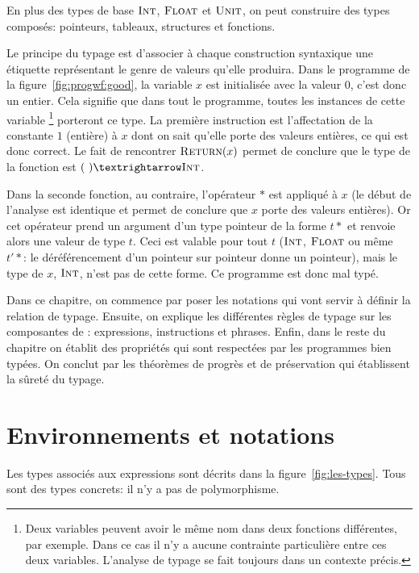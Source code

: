 En plus des types de base $\textsc{Int}$, $\textsc{Float}$ et $\textsc{Unit}$, on peut construire des
types composés: pointeurs, tableaux, structures et fonctions.

Le principe du typage est d'associer à chaque construction syntaxique une
étiquette représentant le genre de valeurs qu'elle produira. Dans le programme
de la figure~\ref{fig:progwf:good}, la variable $x$ est initialisée avec la
valeur $0$, c'est donc un entier. Cela signifie que dans tout le programme,
toutes les instances de cette variable
\footnote{Deux variables peuvent avoir le même nom dans deux fonctions
  différentes, par exemple. Dans ce cas il n'y a aucune contrainte particulière
  entre ces deux variables. L'analyse de typage se fait toujours dans un
  contexte précis.
}
porteront ce type. La première instruction est l'affectation de la constante $1$
(entière) à $x$ dont on sait qu'elle porte des valeurs entières, ce qui est donc
correct. Le fait de rencontrer $\textsc{Return}(x)$ permet de conclure que le type de
la fonction est $(~) → \tInt$.

Dans la seconde fonction, au contraire, l'opérateur $*$ est appliqué à $x$ (le
début de l'analyse est identique et permet de conclure que $x$ porte des valeurs
entières). Or cet opérateur prend un argument d'un type pointeur de la forme
$t*$ et renvoie alors une valeur de type $t$. Ceci est valable pour tout $t$
($\textsc{Int}$, $\textsc{Float}$ ou même $t'*$: le déréférencement d'un pointeur sur pointeur
donne un pointeur), mais le type de $x$, $\textsc{Int}$, n'est pas de cette forme. Ce
programme est donc mal typé.

Dans ce chapitre, on commence par poser les notations qui vont servir à définir
la relation de typage. Ensuite, on explique les différentes règles de typage sur
les composantes de \langname: expressions, instructions et phrases. Enfin, dans
le reste du chapitre on établit des propriétés qui sont respectées par les
programmes bien typées. On conclut par les théorèmes de progrès et de
préservation qui établissent la sûreté du typage.

\section{Environnements et notations}

Les types associés aux expressions sont décrits dans la
figure~\ref{fig:les-types}. Tous sont des types concrets: il n'y a pas de
polymorphisme.

